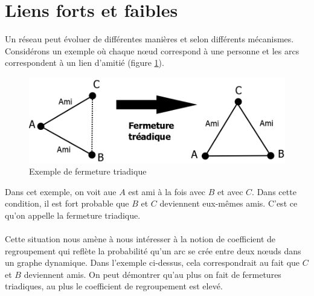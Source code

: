 \section{Liens forts et faibles}
Un réseau peut évoluer de différentes manières et selon différents mécanismes.
Considérons un exemple où chaque n\oe ud correspond à une personne et les arcs correspondent à un lien d'amitié (figure \ref{fermeture_triadique}).
	\begin{figure}
	\center
	\includegraphics[scale=0.5]{images/18_fermeture_triadique.png}
	\caption{\label{fermeture_triadique} Exemple de fermeture triadique}
	\end{figure}
Dans cet exemple, on voit aue $A$ est ami à la fois avec $B$ et avec $C$. Dans cette condition, il est fort probable que $B$ et $C$ deviennent eux-mêmes amis. C'est ce qu'on appelle la fermeture triadique.\\
\\
Cette situation nous amène à nous intéresser à la notion de coefficient de regroupement qui reflète la probabilité qu'un arc se crée entre deux n\oe uds dans un graphe dynamique. 
Dans l'exemple ci-dessus, cela correspondrait au fait que $C$ et $B$ deviennent amis. On peut démontrer qu'au plus on fait de fermetures triadiques, au plus le coefficient de regroupement est elevé.

